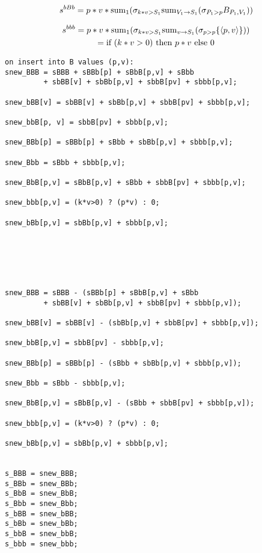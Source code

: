 \begin{multline*}
s^{bBb} =
p * v * \mathrm{sum}_{1}(
\sigma_{k * v > S_1}
\mathrm{sum}_{V_1 \rightarrow S_1}(\sigma_{P_1 > p} B_{P_1, V_1}
))
\end{multline*}


\begin{multline*}
s^{bbb} =
p * v * \mathrm{sum}_{1}(
\sigma_{k * v > S_1}
\mathrm{sum}_{v \rightarrow S_1}(\sigma_{p > p} \{{\langle p,v\rangle}\}))
\\
= \mbox{if ($k*v > 0$) then $p*v$ else $0$}
\end{multline*}













\begin{verbatim}
on insert into B values (p,v):
snew_BBB = sBBB + sBBb[p] + sBbB[p,v] + sBbb
         + sbBB[v] + sbBb[p,v] + sbbB[pv] + sbbb[p,v];

snew_bBB[v] = sbBB[v] + sbBb[p,v] + sbbB[pv] + sbbb[p,v];

snew_bbB[p, v] = sbbB[pv] + sbbb[p,v];

snew_BBb[p] = sBBb[p] + sBbb + sbBb[p,v] + sbbb[p,v];

snew_Bbb = sBbb + sbbb[p,v];

snew_BbB[p,v] = sBbB[p,v] + sBbb + sbbB[pv] + sbbb[p,v];

snew_bbb[p,v] = (k*v>0) ? (p*v) : 0;

snew_bBb[p,v] = sbBb[p,v] + sbbb[p,v];






snew_BBB = sBBB - (sBBb[p] + sBbB[p,v] + sBbb
         + sbBB[v] + sbBb[p,v] + sbbB[pv] + sbbb[p,v]);

snew_bBB[v] = sbBB[v] - (sbBb[p,v] + sbbB[pv] + sbbb[p,v]);

snew_bbB[p,v] = sbbB[pv] - sbbb[p,v];

snew_BBb[p] = sBBb[p] - (sBbb + sbBb[p,v] + sbbb[p,v]);

snew_Bbb = sBbb - sbbb[p,v];

snew_BbB[p,v] = sBbB[p,v] - (sBbb + sbbB[pv] + sbbb[p,v]);

snew_bbb[p,v] = (k*v>0) ? (p*v) : 0;

snew_bBb[p,v] = sbBb[p,v] + sbbb[p,v];


s_BBB = snew_BBB;
s_BBb = snew_BBb;
s_BbB = snew_BbB;
s_Bbb = snew_Bbb;
s_bBB = snew_bBB;
s_bBb = snew_bBb;
s_bbB = snew_bbB;
s_bbb = snew_bbb;



\end{verbatim}



